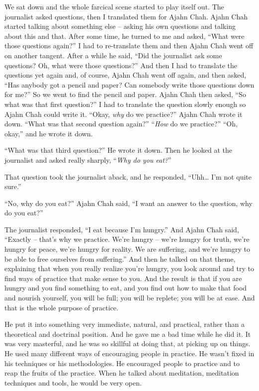 We sat down and the whole farcical scene started to play itself out. 
The journalist asked questions, then I translated them for Ajahn Chah. 
Ajahn Chah started talking about something else -- asking his own
questions and talking about this and that.  After some time, he turned
to me and asked, ``What were those questions again?'' I had to
re-translate them and then Ajahn Chah went off on another tangent. After
a while he said, ``Did the journalist ask some questions? Oh, what were
those questions?'' And then I had to translate the questions yet again
and, of course, Ajahn Chah went off again, and then asked, ``Has anybody
got a pencil and paper? Can somebody write those questions down for
me?'' So we went to find the pencil and paper. Ajahn Chah then asked, 
``So what was that first question?'' I had to translate the question
slowly enough so Ajahn Chah could write it.  ``Okay, \emph{why} do we
practice?'' Ajahn Chah wrote it down. ``What was that second question
again?'' ``\emph{How} do we practice?'' ``Oh, okay,'' and he wrote it down. 

 ``What was that third question?'' He wrote it down. Then he looked at
 the journalist and asked really sharply, ``\emph{Why do you eat?}''

That question took the journalist aback, and he responded, ``Uhh\ldots{}
I'm not quite sure.''

``No, why do you eat?'' Ajahn Chah said, ``I want an answer to the
question, why do you eat?''

The journalist responded, ``I eat because I'm hungry.'' And Ajahn Chah
said, ``Exactly -- that's why we practice. We're hungry -- we're hungry
for truth, we're hungry for peace, we're hungry for reality. We are
suffering, and we're hungry to be able to free ourselves from
suffering.'' And then he talked on that theme, explaining that when you
really realize you're hungry, you look around and try to find ways of
practice that make sense to you. And the result is that if you are
hungry and you find something to eat, and you find out how to make that
food and nourish yourself, you will be full; you will be replete; you
will be at ease.  And that is the whole purpose of practice. 

He put it into something very immediate, natural, and practical, rather
than a theoretical and doctrinal position. And he gave me a bad time
while he did it. It was very masterful, and he was so skillful at doing
that, at picking up on things. He used many different ways of
encouraging people in practice.  He wasn't fixed in his techniques or
his methodologies. He encouraged people to practice and to reap the
fruits of the practice. When he talked about meditation, meditation
techniques and tools, he would be very open. 

